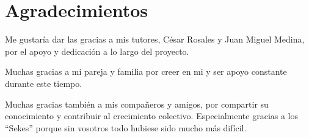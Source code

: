 




\begingroup
\let\clearpage\relax
\let\cleardoublepage\relax
\let\cleardoublepage\relax
\chapter*{Agradecimientos}

Me gustaría dar las gracias a mis tutores, César Rosales y Juan Miguel Medina, por el apoyo y dedicación a lo largo del proyecto.

Muchas gracias a mi pareja y familia por creer en mi y ser apoyo constante durante este tiempo.

Muchas gracias también a mis compañeros y amigos, por compartir su conocimiento y contribuir al crecimiento colectivo. Especialmente gracias a los ``Sekes'' porque sin vosotros todo hubiese sido mucho más difícil.

\endgroup